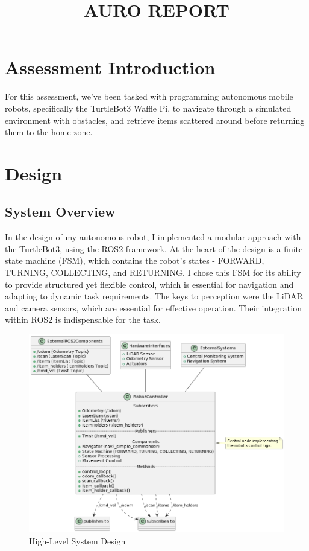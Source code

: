 \documentclass[conference]{IEEEtran}
\begin{document}
\title{AURO REPORT}
\author{
}

\maketitle

\section{Assessment Introduction}
For this assessment, we've been tasked with programming autonomous mobile robots, specifically the TurtleBot3 Waffle Pi, to navigate through a simulated environment with obstacles, and retrieve items scattered around before returning them to the home zone.

\section{Design}
\subsection{System Overview}
In the design of my autonomous robot, I implemented a modular approach with the TurtleBot3, using the ROS2 framework. At the heart of the design is a finite state machine (FSM), which contains the robot's states - FORWARD, TURNING, COLLECTING, and RETURNING. I chose this FSM for its ability to provide structured yet flexible control, which is essential for navigation and adapting to dynamic task requirements. The keys to perception were the LiDAR and camera sensors, which are essential for effective operation. Their integration within ROS2 is indispensable for the task.

\begin{figure}[htbp]
\centerline{\includegraphics[width=\linewidth]{high-level system diagram.png}}
\caption{High-Level System Design}
\label{fig:systemdesign}
\end{figure}
\end{document}
